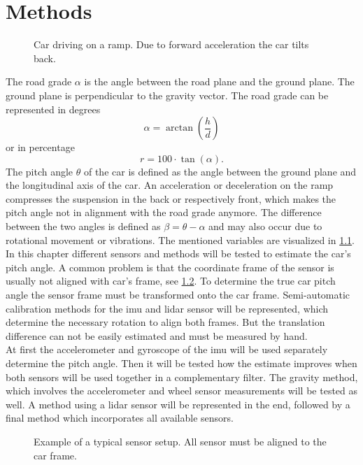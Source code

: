 \chapter{Methods}
\label{ch:Methods}
\begin{figure}[htpb]
    \centering
    
    \caption{Car driving on a ramp. Due to forward acceleration the car tilts back.}
    \label{fig:tikz_car_tilt}
\end{figure}
The road grade $\alpha$ is the angle between the road plane and the ground plane.
The ground plane is perpendicular to the gravity vector.
The road grade can be represented in degrees
\begin{equation}
    \alpha = \arctan(\frac{h}{d})
\end{equation}
or in percentage
\begin{equation}
    r = 100\cdot\tan(\alpha).
\end{equation}
The pitch angle $\theta$ of the car is defined as the angle between the ground plane and the longitudinal axis of the car.
An acceleration or deceleration on the ramp compresses the suspension in the back or respectively front, which makes the pitch angle not in alignment with the road grade anymore.
The difference between the two angles is defined as $\beta = \theta - \alpha$ and may also occur due to rotational movement or vibrations.
The mentioned variables are visualized in \cref{fig:tikz_car_tilt}.\\
In this chapter different sensors and methods will be tested to estimate the car's pitch angle.
A common problem is that the coordinate frame of the sensor is usually not aligned with car's frame, see \cref{fig:tikz_car_frames}.
To determine the true car pitch angle the sensor frame must be transformed onto the car frame.
Semi-automatic calibration methods for the \gls{imu} and \gls{lidar} sensor will be represented, which determine the necessary rotation to align both frames.
But the translation difference can not be easily estimated and must be measured by hand.\\
At first the accelerometer and gyroscope of the \gls{imu} will be used separately determine the pitch angle.
Then it will be tested how the estimate improves when both sensors will be used together in a complementary filter.
The gravity method, which involves the accelerometer and wheel sensor measurements will be tested as well.
A method using a \gls{lidar} sensor will be represented in the end, followed by a final method which incorporates all available sensors.
\begin{figure}[htpb]
    \centering
    
    \caption{Example of a typical sensor setup. All sensor must be aligned to the car frame.}
    \label{fig:tikz_car_frames}
\end{figure}



